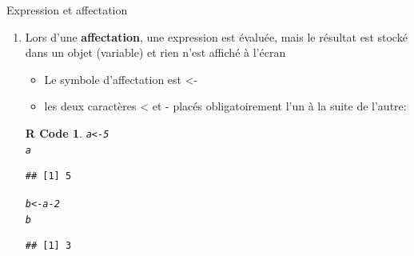 \documentclass[11pt]{beamer}\usepackage[]{graphicx}\usepackage[]{color}
\makeatletter
\newcommand{\hlnum}[1]{\textcolor[rgb]{0.063,0.58,0.627}{#1}}%
\newcommand{\hlopt}[1]{\textcolor[rgb]{0.196,0.196,0.196}{#1}}%
\newcommand{\hlstd}[1]{\textcolor[rgb]{0.196,0.196,0.196}{#1}}%
\newcommand{\hlkwb}[1]{\textcolor[rgb]{0.627,0,0.314}{#1}}%
\newenvironment{kframe}{%
 \def\at@end@of@kframe{}%
 \ifinner\ifhmode%
  \def\at@end@of@kframe{\end{minipage}}%
  \begin{minipage}{\columnwidth}%
 \fi\fi%
 \def\FrameCommand##1{\hskip\@totalleftmargin \hskip-\fboxsep
 \colorbox{shadecolor}{##1}\hskip-\fboxsep
     \hskip-\linewidth \hskip-\@totalleftmargin \hskip\columnwidth}%
 \MakeFramed {\advance\hsize-\width
   \@totalleftmargin\z@ \linewidth\hsize
   \@setminipage}}%
 {\par\unskip\endMakeFramed%
 \at@end@of@kframe}
\newenvironment{knitrout}{}{} %
\newtheorem{rcode}{R Code}[section]
\newcounter{saveenumi}
\newcommand{\seti}{\setcounter{saveenumi}{\value{enumi}}}
\newcommand{\conti}{\setcounter{enumi}{\value{saveenumi}}}
\makeatother
\begin{document}
\begin{frame}[fragile]{Expression et affectation} 
\begin{enumerate}
\conti
\item Lors d’une \textbf{affectation}, une expression est évaluée, mais le résultat est stocké dans un objet (variable) et rien n’est affiché à l’écran
\begin{itemize}
\item Le symbole d’affectation est <-  
\item les deux caractères < et - placés obligatoirement l'un à la suite de l'autre:
\end{itemize}
\pause
\begin{knitrout}
\color{fgcolor}\begin{kframe}
\begin{rcode}\begin{alltt}
\hlstd{a} \hlkwb{<-} \hlnum{5}
\hlstd{a}
\end{alltt}
\begin{verbatim}
## [1] 5
\end{verbatim}
\begin{alltt}
\hlstd{b} \hlkwb{<-} \hlstd{a} \hlopt{-} \hlnum{2}
\hlstd{b}
\end{alltt}
\begin{verbatim}
## [1] 3
\end{verbatim}
\end{rcode}\end{kframe}
\end{knitrout}
\seti
\end{enumerate}

\end{frame}
\end{document}
